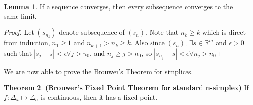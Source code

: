 \documentclass{article}
\theoremstyle{definition}
\newtheorem{theorem}{Theorem}[section]
\newtheorem{lem}[theorem]{Lemma}
\begin{document}
\begin{lem}
\label{subsequence}
If a sequence converges, then every subsequence converges to the same limit.
\end{lem}
\begin{proof}
Let $(s_{n_k})$ denote subsequence of $(s_n)$. Note that $n_k \geq k$ which is direct from induction, $n_1 \geq 1$ and $n_{k+1}>n_k\geq k$. Also since $(s_n)$, $\exists s\in \mathbb{R}^m$ and $\epsilon>0$ such that $|s_j - s|<\epsilon \forall j>n_0$, and $n_j \geq j >n_0$, so $|s_{n_j} - s|<\epsilon \forall n_j>n_0$
\end{proof}
We are now able to prove the Brouwer's Theorem for simplices.
\begin{theorem}
\label{Brouwer}
\textbf{(Brouwer's Fixed Point Theorem for standard n-simplex)} If $f:\Delta_n \mapsto \Delta_n$ is continuous, then it has a fixed point.
\end{theorem}
\end{document}
